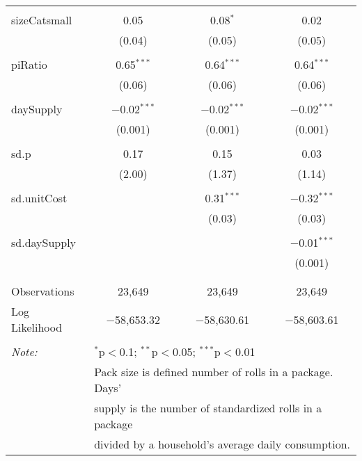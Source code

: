 \begin{table}[!htbp]
\begin{tabular}{@{\extracolsep{5pt}}lccc}
  & & & \\ 
 sizeCatsmall & 0.05 & 0.08$^{*}$ & 0.02 \\ 
  & (0.04) & (0.05) & (0.05) \\ 
  & & & \\ 
 piRatio & 0.65$^{***}$ & 0.64$^{***}$ & 0.64$^{***}$ \\ 
  & (0.06) & (0.06) & (0.06) \\ 
  & & & \\ 
 daySupply & $-$0.02$^{***}$ & $-$0.02$^{***}$ & $-$0.02$^{***}$ \\ 
  & (0.001) & (0.001) & (0.001) \\ 
  & & & \\ 
 sd.p & 0.17 & 0.15 & 0.03 \\ 
  & (2.00) & (1.37) & (1.14) \\ 
  & & & \\ 
 sd.unitCost &  & 0.31$^{***}$ & $-$0.32$^{***}$ \\ 
  &  & (0.03) & (0.03) \\ 
  & & & \\ 
 sd.daySupply &  &  & $-$0.01$^{***}$ \\ 
  &  &  & (0.001) \\ 
  & & & \\ 
\hline \\[-1.8ex] 
Observations & 23,649 & 23,649 & 23,649 \\ 
Log Likelihood & $-$58,653.32 & $-$58,630.61 & $-$58,603.61 \\ 
\hline 
\hline \\[-1.8ex] 
\textit{Note:}  & \multicolumn{3}{l}{$^{*}$p$<$0.1; $^{**}$p$<$0.05; $^{***}$p$<$0.01} \\ 
 & \multicolumn{3}{l}{Pack size is defined number of rolls in a package. Days' } \\ 
 & \multicolumn{3}{l}{supply is the number of standardized rolls in a package} \\ 
 & \multicolumn{3}{l}{divided by a household's average daily consumption.} \\ 
\end{tabular} 
\end{table} 
